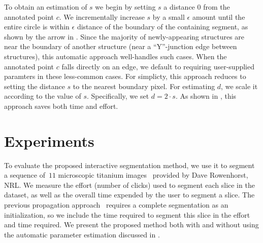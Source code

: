 \documentclass[]{spie}  %
\begin{document}
To obtain an estimation of $s$ we begin by setting $s$ a distance $0$
from the annotated point $c$.  We incrementally increase $s$ by a
small $\epsilon$ amount until the entire circle is within $\epsilon$
distance of the boundary of the containing segment, as shown by the
arrow in .  Since the majority of newly-appearing
structures are near the boundary of another structure (near a
``Y''-junction edge between structures), this automatic approach
well-handles such cases.  When the annotated point $c$ falls directly
on an edge, we default to requiring user-supplied paramters in these
less-common cases.  For simplicty, this approach reduces to setting
the distance $s$ to the nearest boundary pixel.  For estimating $d$,
we scale it according to the value of $s$.  Specifically, we set $d =
2\cdot s$.  As shown in , this approach saves both time and
effort.


\section{Experiments}
\label{sec:ex}

To evaluate the proposed interactive segmentation method, we use it to
segment a sequence of~$11$ microscopic titanium
images~\cite{rowenhorst:10} provided by Dave Rowenhorst, NRL.  We
measure the effort (\ie number of clicks) used to segment each slice
in the dataset, as well as the overall time expended by the user to
segment a slice.  The previous propagation approach~\cite{waggoner:11}
requires a complete segmentation as an initialization, so we include
the time required to segment this slice in the effort and time
required.  We present the proposed method both with and without using
the automatic parameter estimation discussed in .
\end{document}
